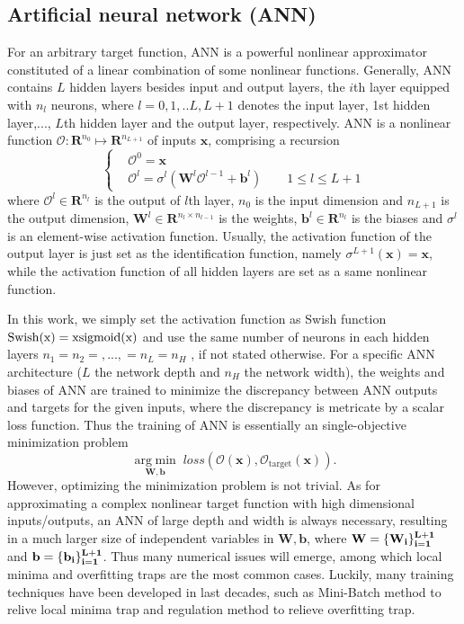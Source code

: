 \documentclass[preprint, 10pt]{elsarticle}
\begin{document}
\subsection{Artificial neural network (ANN) }
For an arbitrary target function, ANN is a powerful nonlinear approximator constituted of a linear combination of some nonlinear functions. Generally, ANN contains $L$ hidden layers besides input and output layers,  the $i$th layer equipped with $n_l$ neurons, where $l=0,1,..L,L+1$ denotes the input layer, 1st hidden layer,..., $L$th hidden layer and the output layer, respectively. ANN is a nonlinear function $\mathcal{O}: \mathbf{R}^{n_0} \mapsto \mathbf{R}^{n_{L+1}}$ of inputs $\mathbf{x}$, comprising a  recursion
\begin{equation}
\left \{
\begin{aligned}
&\mathcal{O}^{0}   = \mathbf{x} \\
&\mathcal{O}^{l}   = \sigma ^{l} \left( \mathbf{W}^{l} \mathcal{O}^{l-1} + \mathbf{b}^{l}
\right)
\qquad 1 \le l \le L+1
\end{aligned}
\right.
\end{equation}
where $\mathcal{O}^{l} \in \mathbf{R}^{n_l}$ is the output of $l$th layer, $n_0$ is the input dimension and $n_{L+1}$ is the output dimension, $\mathbf{W}^{l} \in \mathbf{R}^{n_{l} \times n_{l-1}}$ is the weights, $\mathbf{b}^{l} \in \mathbf{R}^{n_l}$ is the biases and $\sigma ^{l}$ is an element-wise activation function. Usually, the activation function of the output layer is just set as the identification function, namely $\sigma ^{L+1}\left(\mathbf{x}\right)=\mathbf{x}$, while the activation function of all hidden layers are set as a same nonlinear function.

In this work, we simply set the activation function as Swish function $ \rm{Swish}(x) =x \text{sigmoid}(x)$ and use the same number of neurons in each hidden layers $n_1=n_2=,...,=n_L=n_H$ , if not stated otherwise. For a specific ANN architecture ($L$ the network depth and $n_H$ the network width), the weights and biases of ANN are trained to minimize the discrepancy between ANN outputs and targets for the given inputs, where the discrepancy is metricate by a scalar loss function. Thus the training of ANN is essentially an single-objective minimization problem
\begin{equation}
\mathop {\arg \;\min }\limits_{{\mathbf{W,b}}} \;
loss\left( {\mathcal{O}\left(\mathbf{x}\right),\mathcal{O}_\text{target} \left(\mathbf{x}\right)} \right)
.
\end{equation}
However, optimizing the minimization problem is not trivial. As for approximating a complex nonlinear target function with high dimensional inputs/outputs, an ANN of large depth and width is always necessary, resulting in a much larger size of independent variables in $\mathbf{W,b}$, where $\bf{W}=\{W_i\}_{i=1}^{L+1}$ and $\bf{b}=\{b_i\}_{i=1}^{L+1}$. Thus many numerical issues will emerge, among which local minima and overfitting traps are the most common cases. Luckily, many training techniques have been developed in last decades, such as Mini-Batch method to relive local minima trap and regulation method to relieve overfitting trap.
\end{document}
